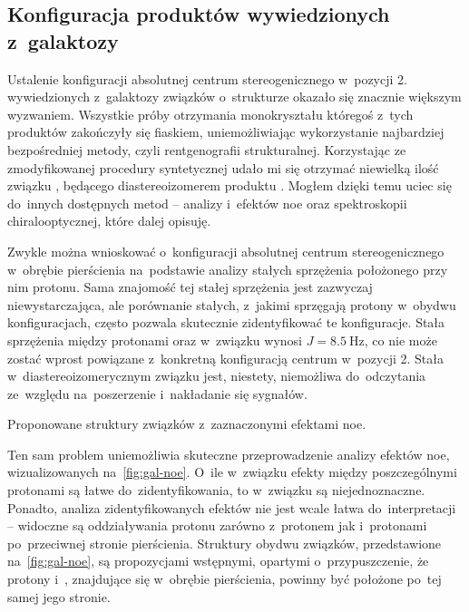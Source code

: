 \subsection{Konfiguracja produktów wywiedzionych z~galaktozy}\label{stereo:galacto}
Ustalenie konfiguracji absolutnej centrum stereogenicznego w~pozycji 2. wywiedzionych
  z~galaktozy związków o~strukturze  okazało się znacznie większym wyzwaniem.
Wszystkie próby otrzymania monokryształu któregoś z~tych produktów zakończyły się fiaskiem,
  uniemożliwiając wykorzystanie najbardziej bezpośredniej metody,
  czyli rentgenografii strukturalnej.
Korzystając ze zmodyfikowanej procedury syntetycznej udało mi się otrzymać niewielką ilość związku ,
  będącego diastereoizomerem produktu .
Mogłem dzięki temu uciec się do~innych dostępnych metod \--- analizy \NMR*{} i~efektów \gls{noe}
  oraz spektroskopii chiralooptycznej, które dalej opisuję.

Zwykle można wnioskować o~konfiguracji absolutnej centrum stereogenicznego w~obrębie pierścienia
  na~podstawie analizy stałych sprzężenia położonego przy nim protonu.
Sama znajomość tej stałej sprzężenia jest zazwyczaj niewystarczająca, ale porównanie stałych,
  z~jakimi sprzęgają protony w~obydwu konfiguracjach, często pozwala skutecznie zidentyfikować
  te konfiguracje.
Stała sprzężenia między protonami  oraz  w~związku  wynosi
  $J = \SI{8.5}{\hertz}$, co nie może zostać wprost powiązane z~konkretną konfiguracją
  centrum w~pozycji 2.
Stała w~diastereoizomerycznym związku  jest, niestety,
  niemożliwa do~odczytania ze~względu na~poszerzenie i~nakładanie się sygnałów.

\begin{marginfigure}
  
  \caption{
    Proponowane struktury związków  z~zaznaczonymi
      efektami \gls{noe}.
  }\label{fig:gal-noe}
\end{marginfigure}

Ten sam problem uniemożliwia skuteczne przeprowadzenie analizy efektów \gls{noe},
  wizualizowanych na~\cref{fig:gal-noe}.
O~ile w~związku  efekty między poszczególnymi protonami są łatwe
  do~zidentyfikowania, to w~związku  są niejednoznaczne.
Ponadto, analiza zidentyfikowanych efektów nie jest wcale łatwa do~interpretacji \---
  widoczne są oddziaływania protonu  zarówno z~protonem  jak i~protonami
   po~przeciwnej stronie pierścienia.
Struktury obydwu związków, przedstawione na~\cref{fig:gal-noe}, są propozycjami wstępnymi,
  opartymi o~przypuszczenie, że protony  i~, znajdujące się w~obrębie
  pierścienia, powinny być położone po~tej samej jego stronie.

